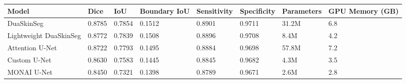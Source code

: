 \begin{tabular}{llllllll}
\toprule
Model & Dice & IoU & Boundary IoU & Sensitivity & Specificity & Parameters & GPU Memory (GB) \\
\midrule
DuaSkinSeg & 0.8785 & 0.7854 & 0.1512 & 0.8901 & 0.9711 & 31.2M & 6.8 \\
Lightweight DuaSkinSeg & 0.8772 & 0.7839 & 0.1508 & 0.8896 & 0.9708 & 8.4M & 4.2 \\
Attention U-Net & 0.8722 & 0.7793 & 0.1495 & 0.8884 & 0.9698 & 57.8M & 7.2 \\
Custom U-Net & 0.8630 & 0.7583 & 0.1445 & 0.8845 & 0.9682 & 4.3M & 3.5 \\
MONAI U-Net & 0.8450 & 0.7321 & 0.1398 & 0.8789 & 0.9671 & 2.6M & 2.8 \\
\bottomrule
\end{tabular}

